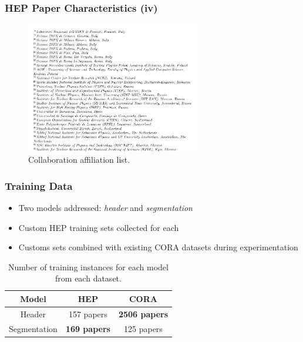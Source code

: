 \documentclass{beamer}
\begin{document}
\begin{frame}
\frametitle{HEP Paper Characteristics (iv)}
\begin{figure}[h]
\center
\includegraphics[width=3in]{Figures/affiliations.pdf}
\caption{Collaboration affiliation list.}
\end{figure}
\end{frame}


\begin{frame}
\frametitle{Training Data}

\begin{itemize}
\item Two models addressed: \emph{header} and \emph{segmentation}
\item Custom HEP training sets collected for each
\item Customs sets combined with existing CORA datasets during experimentation

\end{itemize}

\begin{table}[h]
\begin{center}
\begin{tabular}{|c|c|c|}
\hline
Model & HEP & CORA \\
\hline
Header & 157 papers & \textbf{2506 papers} \\
\hline
Segmentation & \textbf{169 papers} & 125 papers \\
\hline
\end{tabular}
\caption[Number of training instances for each model from each dataset.]{Number of training instances for each model from each dataset.}
\end{center}
\end{table}
\end{frame}

\end{document}
